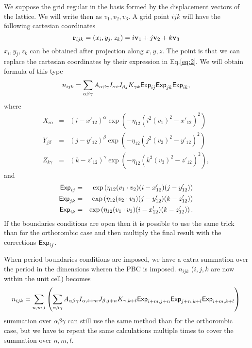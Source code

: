 \documentclass[prb]{revtex4}
\begin{document}
We suppose the grid regular in the basis formed by the displacement vectors of
the lattice. We will write then as $v_1, v_2, v_3$. A grid point $ijk$ will have
the following cartesian coordinates
\begin{equation}
  \label{eq:6}
  {\bf r}_{ijk} = (x_i, y_j, z_k) = i {\bf v}_1 + j {\bf v}_2 + k {\bf v}_3
\end{equation}
$x_i, y_j, z_k$ can be obtained after projection along $x,y,z$. The point is
that we can replace the cartesian coordinates by their expression in
Eq.\ref{eq:2}. We will obtain formula of this type
\begin{equation}
  n_{ijk} = \sum_{\alpha\beta\gamma}  A_{\alpha\beta\gamma} I_{\alpha i} J_{\beta j} K_{\gamma k} {\sf Exp}_{ij} {\sf Exp}_{jk} {\sf Exp}_{ik},
\end{equation}
where
\begin{eqnarray}
  X_{i\alpha} &=& (i - x'_{12})^\alpha \exp(-\eta_{12} (i ^ 2 (v_1)^2 - x'_{12})^2)\\
  Y_{j\beta} &=& (j - y'_{12})^\beta \exp(-\eta_{12} (j ^ 2 (v_2)^2 - y'_{12})^2)\\
  Z_{k\gamma} &=& (k - z'_{12})^\gamma \exp(-\eta_{12} (k^2 (v_3)^2 - z'_{12})^2),
\end{eqnarray}
and
\begin{eqnarray}
  {\sf Exp}_{ij} &=& \exp\left(\eta_{12} (v_1 \cdot v_2) (i-x'_{12})(j-y'_{12}) \right)\\
  {\sf Exp}_{jk} &=& \exp\left(\eta_{12} (v_2 \cdot v_3) (j-y'_{12})(k-z'_{12}) \right)\\
  {\sf Exp}_{ik} &=& \exp\left(\eta_{12} (v_1 \cdot v_3) (i-x'_{12})(k-z'_{12}) \right).
\end{eqnarray}
If the boundaries conditions are open then it is possible to use the same trick
than for the orthorombic case and then multiply the final result with the
corrections ${\sf Exp}_{ij}$.

When period boundaries conditions are imposed, we have a extra summation over
the period in the dimensions wheren the PBC is imposed. $n_{ijk}$ ($i,j,k$ are
now within the unit cell) becomes
\begin{equation}
  n_{ijk} = \sum_{n,m,l} \left(\sum_{\alpha\beta\gamma}
  A_{\alpha\beta\gamma} I_{\alpha, i+m} J_{\beta, j+n} K_{\gamma, {k+l}} {\sf
    Exp}_{i+m, j+n} {\sf Exp}_{j+n, k+l} {\sf Exp}_{i + m, k + l}\right)
\end{equation}
summation over $\alpha\beta\gamma$ can still use the same method than for the
orthorombic case, but we have to repeat the same calculations multiple times to
cover the summation over $n,m,l$.
\end{document}
